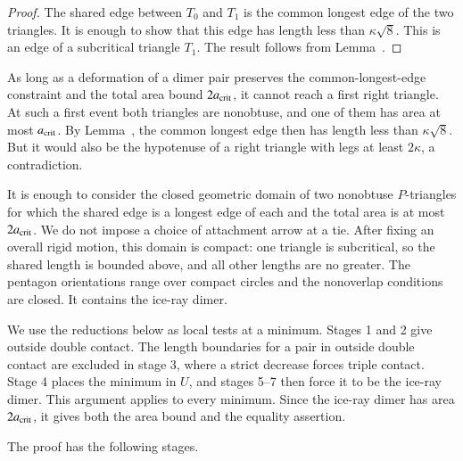 \begin{proof}  
  The shared edge between $T_0$ and $T_1$ is the common longest edge
  of the two triangles.  It is enough to show that this edge has
  length less than $\kappa\sqrt8$.  This is an edge of a subcritical
  triangle $T_1$. The result follows from Lemma~.
\end{proof}

As long as a deformation of a dimer pair preserves the common-longest-edge
constraint and the total area bound $2a_\text{crit}$, it cannot reach a
first right triangle.  At such a first event both triangles are
nonobtuse, and one of them has area at most $a_\text{crit}$.  By
Lemma~, the common longest edge then has length
less than $\kappa\sqrt8$.  But it would also be the hypotenuse of
a right triangle with legs at least $2\kappa$, a contradiction.

It is enough to consider the closed geometric domain of two
nonobtuse $P$-triangles for which the shared edge is a longest
edge of each and the total area is at most $2a_\text{crit}$.
We do not impose a choice of attachment arrow at a tie.
After fixing an overall rigid motion, this domain is compact:
one triangle is subcritical, so the shared length is bounded above,
and all other lengths are no greater. The pentagon orientations
range over compact circles and the nonoverlap conditions are
closed. It contains the ice-ray dimer.

We use the reductions below as local tests at a minimum. Stages 1 and 2
give outside double contact. The length boundaries for a pair in outside
double contact are excluded in stage 3, where a strict decrease forces
triple contact. Stage 4 places the minimum in $U$, and stages 5--7 then
force it to be the ice-ray dimer. This argument applies to every minimum.
Since the ice-ray dimer has area $2a_\text{crit}$, it gives both the area
bound and the equality assertion.

The proof has the following stages.

